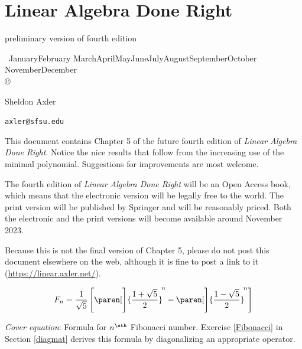 \setcounter{secnumdepth}{-1}


\chapter{Linear Algebra Done Right}

\thispagestyle{empty}

\begin{center}

preliminary version of fourth edition

{\footnotesize
\number\day\ \ifcase\month\or January\or February\or
March\or April\or May\or June\or July\or August\or September\or October\or
November\or December\fi\ \number\year\\
\copyright\ \number\year}

\vfill

{\huge
Sheldon Axler}

\texttt{axler@sfsu.edu}

\end{center}

\vfill

\noindent
This document contains Chapter 5 of the future fourth edition of \textit{Linear Algebra Done Right}. Notice the nice results that follow from the increasing use of the minimal polynomial. Suggestions for improvements are most welcome.

\bigskip

\noindent
The fourth edition of \textit{Linear Algebra Done Right} will be an Open Access book, which means that the electronic version will be legally free to the world. The print version will be published by Springer and will be reasonably priced. Both the electronic and the print versions will become available around November 2023.

\bigskip

\noindent
Because this is not the final version of Chapter 5, please do not post this document elsewhere on the web, although it is fine to post a link to it (\url{https://linear.axler.net/}).

\bigskip

{
\[
F_n = \frac{1}{\sqrt{5}} \, \Biggl[ \paren[\Bigg]{ \frac{1 + \sqrt{5}}{2} }^{\!n}
-\paren[\Bigg]{ \frac{1 - \sqrt{5}}{2} }^{\!n} \Biggr]
\]
}

\noindent
\textit{Cover equation}: Formula for $n^\nth$ Fibonacci number. Exercise \ref{Fibonacci} in Section \ref{diagmat} derives this formula by diagonalizing an appropriate operator.

